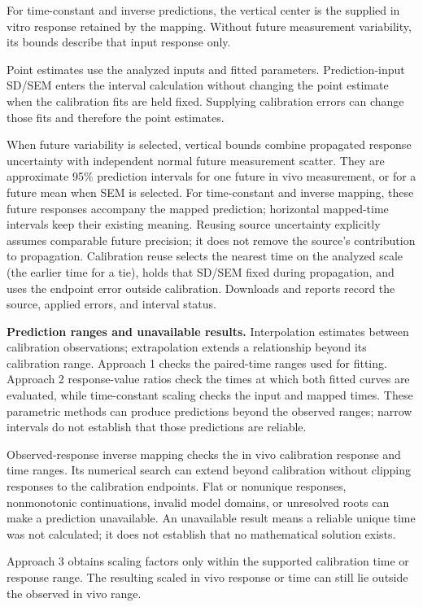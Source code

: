 For time-constant and inverse predictions, the vertical center is the supplied in vitro response retained by the mapping. Without future measurement variability, its bounds describe that input response only.

Point estimates use the analyzed inputs and fitted parameters. Prediction-input SD/SEM enters the interval calculation without changing the point estimate when the calibration fits are held fixed. Supplying calibration errors can change those fits and therefore the point estimates.

When future variability is selected, vertical bounds combine propagated response uncertainty with independent normal future measurement scatter. They are approximate 95\% prediction intervals for one future in vivo measurement, or for a future mean when SEM is selected. For time-constant and inverse mapping, these future responses accompany the mapped prediction; horizontal mapped-time intervals keep their existing meaning. Reusing source uncertainty explicitly assumes comparable future precision; it does not remove the source's contribution to propagation. Calibration reuse selects the nearest time on the analyzed scale (the earlier time for a tie), holds that SD/SEM fixed during propagation, and uses the endpoint error outside calibration. Downloads and reports record the source, applied errors, and interval status.

\textbf{Prediction ranges and unavailable results.} Interpolation estimates between calibration observations; extrapolation extends a relationship beyond its calibration range. Approach 1 checks the paired-time ranges used for fitting. Approach 2 response-value ratios check the times at which both fitted curves are evaluated, while time-constant scaling checks the input and mapped times. These parametric methods can produce predictions beyond the observed ranges; narrow intervals do not establish that those predictions are reliable.

Observed-response inverse mapping checks the in vivo calibration response and time ranges. Its numerical search can extend beyond calibration without clipping responses to the calibration endpoints. Flat or nonunique responses, nonmonotonic continuations, invalid model domains, or unresolved roots can make a prediction unavailable. An unavailable result means a reliable unique time was not calculated; it does not establish that no mathematical solution exists.

Approach 3 obtains scaling factors only within the supported calibration time or response range. The resulting scaled in vivo response or time can still lie outside the observed in vivo range.

